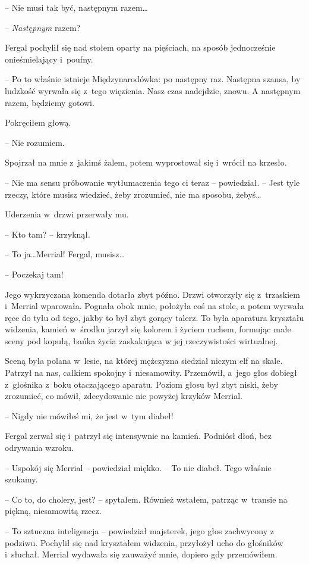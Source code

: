 \documentclass[oneside,polish,11pt,sfheadings]{mwbk}
\begin{document}
-- Nie musi tak być, następnym razem\ldots

-- \textit{Następnym }razem?

Fergal pochylił się nad stołem oparty na pięściach, na sposób
jednocześnie onieśmielający i~poufny. 

-- Po to właśnie istnieje
Międzynarodówka: po następny raz. Następna szansa, by ludzkość wyrwała
się z~tego więzienia. Nasz czas nadejdzie, znowu. A następnym razem,
będziemy gotowi.

Pokręciłem głową. 

-- Nie rozumiem.

Spojrzał na mnie z~jakimś żalem, potem wyprostował się i~wrócił na
krzesło. 

-- Nie ma sensu próbowanie wytłumaczenia tego ci teraz -- powiedział. -- Jest tyle rzeczy, które musisz wiedzieć, żeby zrozumieć,
nie ma sposobu, żebyś\ldots

Uderzenia w~drzwi przerwały mu.

-- Kto tam? -- krzyknął.

-- To ja\ldots Merrial! Fergal, musisz\ldots

-- Poczekaj tam!

Jego wykrzyczana komenda dotarła zbyt późno. Drzwi otworzyły się z~trzaskiem i~Merrial wparowała. Pognała obok mnie, położyła coś na stole,
a potem wyrwała ręce do tyłu od tego, jakby to był zbyt gorący talerz.
To była aparatura kryształu widzenia, kamień w~środku jarzył się kolorem
i życiem ruchem, formując małe sceny pod kopułą, bańka życia zaskakująca
w jej rzeczywistości wirtualnej.

Sceną była polana w~lesie, na której mężczyzna siedział niczym elf na
skale. Patrzył na nas, całkiem spokojny i~niesamowity. Przemówił, a~jego
głos dobiegł z~głośnika z~boku otaczającego aparatu. Poziom głosu był
zbyt niski, żeby zrozumieć, co mówił, zdecydowanie nie powyżej krzyków
Merrial.

-- Nigdy nie mówiłeś mi, że jest w~tym diabeł!

Fergal zerwał się i~patrzył się intensywnie na kamień. Podniósł dłoń,
bez odrywania wzroku.

-- Uspokój się Merrial -- powiedział miękko. -- To nie diabeł. Tego właśnie
szukamy.

-- Co to, do cholery, jest? -- spytałem. Również wstałem, patrząc w~transie na piękną, niesamowitą rzecz.

-- To sztuczna inteligencja -- powiedział majsterek, jego głos zachwycony
z podziwu. Pochylił się nad kryształem widzenia, przyłożył ucho do
głośników i~słuchał. Merrial wydawała się zauważyć mnie, dopiero gdy
przemówiłem.
\end{document}
